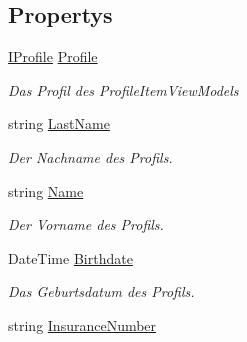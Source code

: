 \subsection*{Propertys}
\begin{DoxyCompactItemize}
\item 
\mbox{\hyperlink{interfacemy_m_d_1_1_model_interface_1_1_data_model_interface_1_1_i_profile}{I\+Profile}} \mbox{\hyperlink{classmy_m_d_1_1_view_model_1_1_profile_tab_view_model_1_1_profile_item_view_model_a91367f8be2f7fda904e1292cd5049c35}{Profile}}
\begin{DoxyCompactList}\small\item\em Das Profil des Profile\+Item\+View\+Models \end{DoxyCompactList}\item 
string \mbox{\hyperlink{classmy_m_d_1_1_view_model_1_1_profile_tab_view_model_1_1_profile_item_view_model_abf7ee39f67915e326cbaa633368b9846}{Last\+Name}}
\begin{DoxyCompactList}\small\item\em Der Nachname des Profils. \end{DoxyCompactList}\item 
string \mbox{\hyperlink{classmy_m_d_1_1_view_model_1_1_profile_tab_view_model_1_1_profile_item_view_model_aa16bc16413aef57a6b63caedf7b5632a}{Name}}
\begin{DoxyCompactList}\small\item\em Der Vorname des Profils. \end{DoxyCompactList}\item 
Date\+Time \mbox{\hyperlink{classmy_m_d_1_1_view_model_1_1_profile_tab_view_model_1_1_profile_item_view_model_ae34d809cc99f6592154df455ad3b7ef9}{Birthdate}}
\begin{DoxyCompactList}\small\item\em Das Geburtsdatum des Profils. \end{DoxyCompactList}\item 
string \mbox{\hyperlink{classmy_m_d_1_1_view_model_1_1_profile_tab_view_model_1_1_profile_item_view_model_ac303c5083bf4ad4b307798a4c4e8af6e}{Insurance\+Number}}

\end{DoxyCompactItemize}
